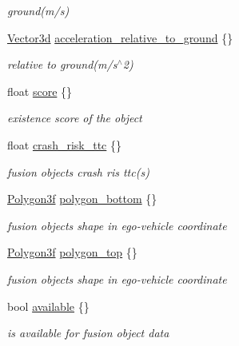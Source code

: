 \begin{DoxyCompactItemize}
\begin{DoxyCompactList}\small\item\em ground(m/s) \end{DoxyCompactList}\item 
\hyperlink{structmaf__perception__interface_1_1Vector3d}{Vector3d} \hyperlink{structmaf__perception__interface_1_1PerceptionFusionObjectData_a12523cd30976350ef0ce2fd92ea15f23}{acceleration\+\_\+relative\+\_\+to\+\_\+ground} \{\}
\begin{DoxyCompactList}\small\item\em relative to ground(m/s$^\wedge$2) \end{DoxyCompactList}\item 
float \hyperlink{structmaf__perception__interface_1_1PerceptionFusionObjectData_a42adc9ff343b47058061d06588262709}{score} \{\}
\begin{DoxyCompactList}\small\item\em existence score of the object \end{DoxyCompactList}\item 
float \hyperlink{structmaf__perception__interface_1_1PerceptionFusionObjectData_a8bcc15ddd4ccea3974f7729e939092c2}{crash\+\_\+risk\+\_\+ttc} \{\}
\begin{DoxyCompactList}\small\item\em fusion objects crash ris ttc(s) \end{DoxyCompactList}\item 
\hyperlink{structmaf__perception__interface_1_1Polygon3f}{Polygon3f} \hyperlink{structmaf__perception__interface_1_1PerceptionFusionObjectData_ae1f80e92a22895583134dd58daf73f65}{polygon\+\_\+bottom} \{\}
\begin{DoxyCompactList}\small\item\em fusion objects shape in ego-\/vehicle coordinate \end{DoxyCompactList}\item 
\hyperlink{structmaf__perception__interface_1_1Polygon3f}{Polygon3f} \hyperlink{structmaf__perception__interface_1_1PerceptionFusionObjectData_a28f29670e2f830763fdaa01f0560b049}{polygon\+\_\+top} \{\}
\begin{DoxyCompactList}\small\item\em fusion objects shape in ego-\/vehicle coordinate \end{DoxyCompactList}\item 
bool \hyperlink{structmaf__perception__interface_1_1PerceptionFusionObjectData_ad4e3b8b2ba44a282992837813900cf4f}{available} \{\}
\begin{DoxyCompactList}\small\item\em is available for fusion object data \end{DoxyCompactList}\item 

\end{DoxyCompactItemize}
